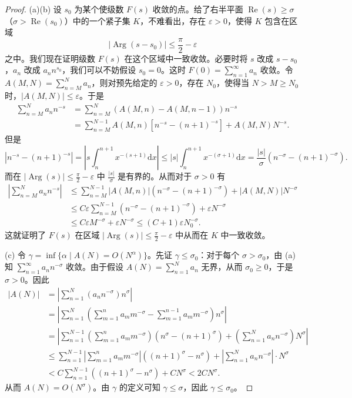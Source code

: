 \begin{proof}
(a)(b) 设 $s_0$ 为某个使级数 $F(s)$ 收敛的点。给了右半平面 $\operatorname{Re}(s)\geqslant\sigma$（$\sigma>\operatorname{Re}(s_0)$）中的一个紧子集 $K$，不难看出，存在 $\varepsilon>0$，使得 $K$ 包含在区域
\[
  |\operatorname{Arg}(s-s_0)|\leqslant\frac{\pi}{2}-\varepsilon
\]
之中。我们现在证明级数 $F(s)$ 在这个区域中一致收敛。必要时将 $s$ 改成 $s-s_0$，$a_n$ 改成 $a_nn^{s_0}$，我们可以不妨假设 $s_0=0$。这时 $F(0)=\sum_{n=1}^{\infty}a_n$ 收敛。令 $A(M,N)=\sum_{n=M}^{N}a_n$，则对预先给定的 $\varepsilon>0$，存在 $N_0$，使得当 $N>M\geqslant N_0$ 时，$|A(M,N)|\leqslant\varepsilon$。于是
\begin{align*}
  \sum_{n=M}^{N}a_nn^{-s}
  &=\sum_{n=M}^{N}(A(M,n)-A(M,n-1))n^{-s}\\
  &=\sum_{n=M}^{N-1}A(M,n)[n^{-s}-(n+1)^{-s}]+A(M,N)N^{-s}.
\end{align*}
但是
\[
  |n^{-s}-(n+1)^{-s}|=\left|s\int_n^{n+1}x^{-(s+1)}\mathrm{d}x\right|
  \leqslant|s|\int_n^{n+1}x^{-(\sigma+1)}\mathrm{d}x
  =\frac{|s|}{\sigma}(n^{-\sigma}-(n+1)^{-\sigma}).
\]
而在 $|\operatorname{Arg}(s)|\leqslant\frac{\pi}{2}-\varepsilon$ 中 $\frac{|s|}{\sigma}$ 是有界的。从而对于 $\sigma>0$ 有
\begin{align*}
  \left|\sum_{n=M}^{N}a_nn^{-s}\right|
  &\leqslant\sum_{n=M}^{N-1}|A(M,n)|(n^{-\sigma}-(n+1)^{-\sigma})+|A(M,N)|N^{-\sigma}\\
  &\leqslant C\varepsilon\sum_{n=M}^{N-1}(n^{-\sigma}-(n+1)^{-\sigma})+\varepsilon N^{-\sigma}\\
  &\leqslant C\varepsilon M^{-\sigma}+\varepsilon N^{-\sigma}\leqslant(C+1)\varepsilon N_0^{-\sigma}.
\end{align*}
这就证明了 $F(s)$ 在区域 $|\operatorname{Arg}(s)|\leqslant\frac{\pi}{2}-\varepsilon$ 中从而在 $K$ 中一致收敛。

(c) 令 $\gamma=\inf\{\alpha\mid A(N)=O(N^{\alpha})\}$。先证 $\gamma\leqslant\sigma_0$：对于每个 $\sigma>\sigma_0$，由 (a) 知 $\sum_{n=1}^{\infty}a_nn^{-\sigma}$ 收敛。由于假设 $A(N)=\sum_{n=1}^{N}a_n$ 无界，从而 $\sigma_0\geqslant 0$，于是 $\sigma>0$。因此
\begin{align*}
  |A(N)|&=\left|\sum_{n=1}^{N}(a_nn^{-\sigma})n^{\sigma}\right|\\
  &=\left|\sum_{n=1}^{N}\left(\sum_{m=1}^{n}a_mm^{-\sigma}-\sum_{m=1}^{n-1}a_mm^{-\sigma}\right)n^{\sigma}\right|\\
  &=\left|\sum_{n=1}^{N-1}\left(\sum_{m=1}^{n}a_mm^{-\sigma}\right)(n^{\sigma}-(n+1)^{\sigma})+\left(\sum_{n=1}^{N}a_nn^{-\sigma}\right)N^{\sigma}\right|\\
  &\leqslant\sum_{n=1}^{N-1}\left|\sum_{m=1}^{n}a_mm^{-\sigma}\right|((n+1)^{\sigma}-n^{\sigma})+\left|\sum_{n=1}^{N}a_nn^{-\sigma}\right|\cdot N^{\sigma}\\
  &<C\sum_{n=1}^{N-1}((n+1)^{\sigma}-n^{\sigma})+CN^{\sigma}<2CN^{\sigma}.
\end{align*}
从而 $A(N)=O(N^{\sigma})$。由 $\gamma$ 的定义可知 $\gamma\leqslant\sigma$，因此 $\gamma\leqslant\sigma_0$。


\end{proof}
